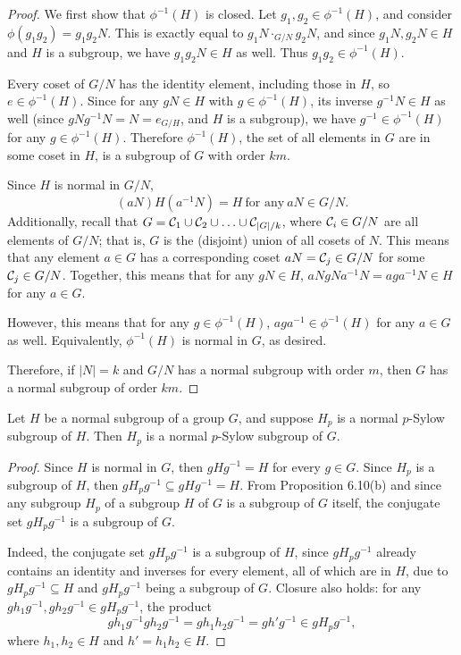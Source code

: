 \documentclass{homework}
\begin{document}
\begin{solution}
\begin{enumerate}[label=(\alph*)]
\begin{proof}[Proof]
        We first show that $\phi^{-1}(H)$ is closed. Let $g_1,g_2\in \phi^{-1}(H)$, and consider
        $\phi(g_1g_2)=g_1g_2N$. This is exactly equal to $g_1N\cdot_{G /N}g_2N$, and since $g_1N,g_2N\in
        H$ and $H$ is a subgroup, we have $g_1g_2N\in H$ as well. Thus $g_1g_2\in \phi^{-1}(H)$.

        Every coset of $G / N$ has the identity element, including those in $H$, so $e\in \phi^{-1}(H)$.
        Since for any $gN\in H$ with $g\in \phi^{-1}(H)$, its inverse $g^{-1}N\in H$ as well (since
        $gNg^{-1}N=N=e_{G /H}$, and $H$ is a subgroup), we have $g^{-1}\in \phi^{-1}(H)$ for any $g\in
        \phi^{-1}(H)$. Therefore $\phi^{-1}(H)$, the set of all elements in $G$ are in some coset in
        $H$, is a subgroup of $G$ with order $km$.

        Since $H$ is normal in $G / N$, \[
          (aN)H(a^{-1}N)=H~\text{for any}~aN\in G /N
        .\] Additionally, recall that $G= \mathcal{C}_1\cup \mathcal{C}_2\cup \ldots\cup \mathcal{C}_{\left| G \right|
        /k}$, where $\mathcal{C}_i\in G /N$ are all elements of $G /N$; that is, $G$ is the (disjoint) union
        of all cosets of $N$. This means that any element $a\in G$ has a corresponding coset
        $aN=\mathcal{C}_j\in G /N$ for some $\mathcal{C}_j\in G /N$. Together, this means that for any $gN\in H$,
        $aNgNa^{-1}N=aga^{-1}N\in H$ for any $a\in G$.

        However, this means that for any $g\in \phi^{-1}(H)$, $aga^{-1}\in \phi^{-1}(H)$ for any $a\in
        G$ as well. Equivalently, $\phi^{-1}(H)$ is normal in $G$, as desired.

        Therefore, if $\left| N \right| =k$ and $G /N$ has a normal subgroup with order $m$, then $G$
        has a normal subgroup of order $km$.
      \end{proof}
      \begin{lemma}{}
        Let $H$ be a normal subgroup of a group $G$, and suppose $H_p$ is a normal $p$-Sylow subgroup of
        $H$. Then $H_p$ is a normal $p$-Sylow subgroup of $G$.
      \end{lemma}
      \begin{proof}[Proof]
        Since $H$ is normal in $G$, then $gHg^{-1}=H$ for every $g\in G$. Since $H_p$ is a subgroup of
        $H$, then $gH_pg^{-1}\subseteq gHg^{-1}=H$. From Proposition 6.10(b) and since any subgroup
        $H_p$ of a subgroup $H$ of $G$ is a subgroup of $G$ itself, the conjugate set $gH_pg^{-1}$ is a
        subgroup of $G$.

        Indeed, the conjugate set $gH_pg^{-1}$ is a subgroup of $H$, since $gH_pg^{-1}$ already contains
        an identity and inverses for every element, all of which are in $H$, due to $gH_pg^{-1}\subseteq
        H$ and $gH_pg^{-1}$ being a subgroup of $G$. Closure also holds: for any
        $gh_1g^{-1},gh_2g^{-1}\in gH_pg^{-1}$, the product \[
          gh_1g^{-1}gh_2g^{-1}=gh_1h_2g^{-1}=gh'g^{-1}\in gH_pg^{-1}
        ,\] where $h_1,h_2\in H$ and $h'=h_1h_2\in H$. 


\end{proof}
\end{enumerate}
\end{solution}
\end{document}
